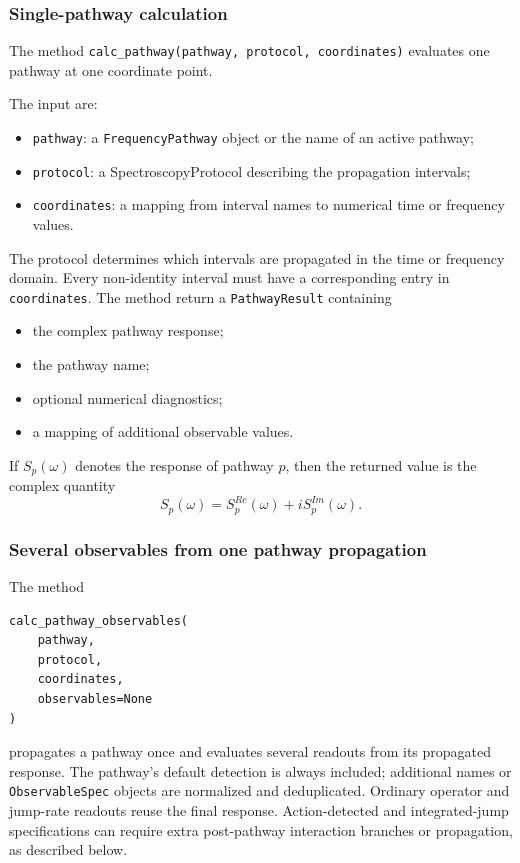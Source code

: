 \documentclass[11pt]{article}
\begin{document}
\subsubsection{Single-pathway calculation}

The method \texttt{calc\_pathway(pathway, protocol, coordinates)} evaluates one pathway at one coordinate point. 

The input are:
\begin{itemize}
    \item \texttt{pathway}: a \texttt{FrequencyPathway} object or the name of an active pathway;
    \item \texttt{protocol}: a SpectroscopyProtocol describing the propagation intervals;
    \item \texttt{coordinates}: a mapping from interval names to numerical time or frequency values. 
\end{itemize}

The protocol determines which intervals are propagated in the time or frequency domain. Every non-identity interval must have a corresponding entry in \texttt{coordinates}. The method return a \texttt{PathwayResult} containing
\begin{itemize}
    \item the complex pathway response;
    \item the pathway name;
    \item optional numerical diagnostics;
    \item a mapping of additional observable values.
\end{itemize}

If $S_p(\omega)$ denotes the response of pathway $p$, then the returned value is the complex quantity 
\begin{equation}
    S_p(\omega)= S_p^{Re}(\omega) + iS_p^{Im}(\omega).
\end{equation}

\subsubsection{Several observables from one pathway propagation}

The method 
\begin{verbatim}
calc_pathway_observables(
    pathway,
    protocol,
    coordinates,
    observables=None
)
\end{verbatim}

propagates a pathway once and evaluates several readouts from its propagated response. The pathway's default detection is always included; additional names or \texttt{ObservableSpec} objects are normalized and deduplicated. Ordinary operator and jump-rate readouts reuse the final response. Action-detected and integrated-jump specifications can require extra post-pathway interaction branches or propagation, as described below.
\end{document}
